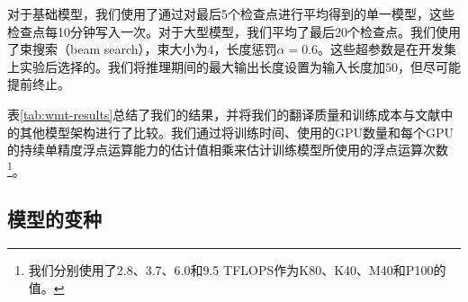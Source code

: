 \documentclass[lang=cn,a4paper,newtx]{elegantpaper}
\begin{document}
对于基础模型，我们使用了通过对最后5个检查点进行平均得到的单一模型，这些检查点每10分钟写入一次。对于大型模型，我们平均了最后20个检查点。我们使用了束搜索（beam search），束大小为$4$，长度惩罚$\alpha=0.6$。这些超参数是在开发集上实验后选择的。我们将推理期间的最大输出长度设置为输入长度加$50$，但尽可能提前终止。

表\ref{tab:wmt-results}总结了我们的结果，并将我们的翻译质量和训练成本与文献中的其他模型架构进行了比较。我们通过将训练时间、使用的GPU数量和每个GPU的持续单精度浮点运算能力的估计值相乘来估计训练模型所使用的浮点运算次数\footnote{我们分别使用了2.8、3.7、6.0和9.5 TFLOPS作为K80、K40、M40和P100的值。}。

\subsection{模型的变种}
\end{document}
